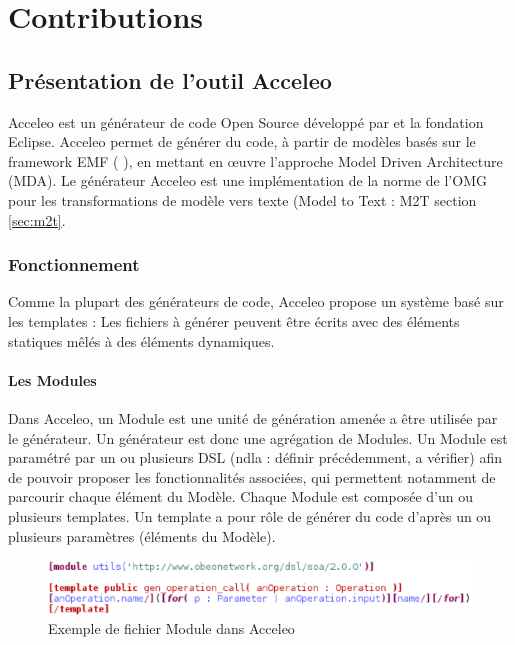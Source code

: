 \chapter{Contributions}\label{chap:tra}

\section{Présentation de l'outil Acceleo}\label{sec:acc}

Acceleo est un générateur de code Open Source développé par \kwobeo{} et la fondation Eclipse. Acceleo permet de générer du code, à partir de modèles basés sur le framework EMF (\cf{} \cite{emf}), en mettant en œuvre l'approche Model Driven Architecture (MDA). Le générateur Acceleo est une implémentation de la norme de l'OMG pour les transformations de modèle vers texte (Model to Text : M2T \cf{} section \ref{sec:m2t}.

\subsection{Fonctionnement}

Comme la plupart des générateurs de code, Acceleo propose un système basé sur les templates : Les fichiers à générer peuvent être écrits avec des éléments statiques mêlés à des éléments dynamiques.

\subsubsection{Les Modules}

Dans Acceleo, un Module est une unité de génération amenée a être utilisée par le générateur. Un générateur est donc une agrégation de Modules. Un Module est paramétré par un ou plusieurs DSL (ndla : définir précédemment, a vérifier) afin de pouvoir proposer les fonctionnalités associées, qui permettent notamment de parcourir chaque élément du Modèle. Chaque Module est composée d'un ou plusieurs templates. Un template a pour rôle de générer du code d'après un ou plusieurs paramètres (éléments du Modèle).

\begin{figure}[htb]
  \centering
  \includegraphics[scale=0.6]{img/screen_template.eps}
  \caption{Exemple de fichier Module dans Acceleo}
  \label{fig:acc_module}
\end{figure}

